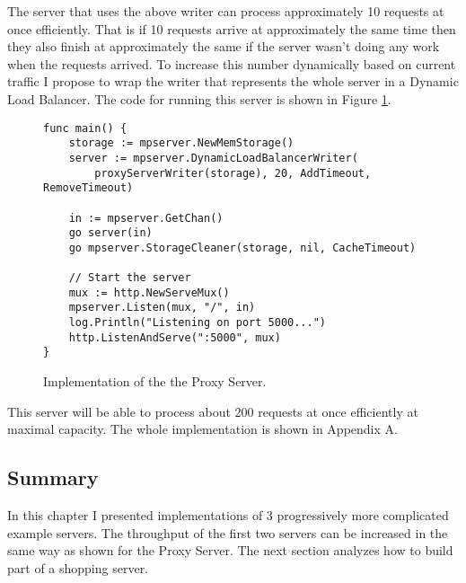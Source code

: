 \newpage
The server that uses the above writer can process approximately 10 requests
at once efficiently. That is if 10 requests arrive at approximately the same
time then they also finish at approximately the same if the server wasn't
doing any work when the requests arrived.
To increase this number dynamically based on current traffic I propose
to wrap the writer that represents the whole server in a Dynamic Load
Balancer. The code for running this server is shown in Figure 
\ref{fig:ProxyServerImpl}.
\begin{figure}[h]
\begin{lstlisting}
func main() {
    storage := mpserver.NewMemStorage()
    server := mpserver.DynamicLoadBalancerWriter(
        proxyServerWriter(storage), 20, AddTimeout, RemoveTimeout)

    in := mpserver.GetChan()
    go server(in)
    go mpserver.StorageCleaner(storage, nil, CacheTimeout)

    // Start the server
    mux := http.NewServeMux()
    mpserver.Listen(mux, "/", in)
    log.Println("Listening on port 5000...")
    http.ListenAndServe(":5000", mux)
}
\end{lstlisting}
\caption[scale=1.0]{Implementation of the the Proxy Server.}
\label{fig:ProxyServerImpl}
\end{figure}

This server will be able to process about 200 requests at once efficiently
at maximal capacity. The whole implementation is shown in Appendix A.

\subsection{Summary}
In this chapter I presented implementations of 3 progressively more 
complicated example servers. The throughput of the first two servers
can be increased in the same way as shown for the Proxy Server. The 
next section analyzes how to build part of a shopping server.


